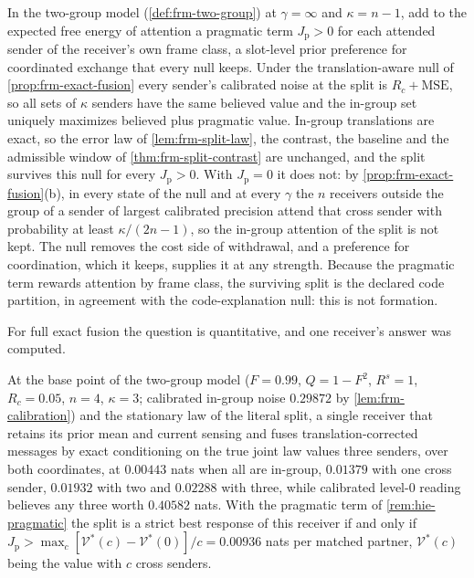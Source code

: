 \begin{remark}\label{rem:hie-pragmatic}
In the two-group model (\cref{def:frm-two-group}) at $\gamma=\infty$ and $\kappa=n-1$, add to the expected free energy of attention a pragmatic term $J_{\mathrm p}>0$ for each attended sender of the receiver's own frame class, a slot-level prior preference for coordinated exchange that every null keeps. Under the translation-aware null of \cref{prop:frm-exact-fusion} every sender's calibrated noise at the split is $R_c+\mathrm{MSE}$, so all sets of $\kappa$ senders have the same believed value and the in-group set uniquely maximizes believed plus pragmatic value. In-group translations are exact, so the error law of \cref{lem:frm-split-law}, the contrast, the baseline and the admissible window of \cref{thm:frm-split-contrast} are unchanged, and the split survives this null for every $J_{\mathrm p}>0$. With $J_{\mathrm p}=0$ it does not: by \cref{prop:frm-exact-fusion}(b), in every state of the null and at every $\gamma$ the $n$ receivers outside the group of a sender of largest calibrated precision attend that cross sender with probability at least $\kappa/(2n-1)$, so the in-group attention of the split is not kept. The null removes the cost side of withdrawal, and a preference for coordination, which it keeps, supplies it at any strength. Because the pragmatic term rewards attention by frame class, the surviving split is the declared code partition, in agreement with the code-explanation null: this is not formation.
\end{remark}

For full exact fusion the question is quantitative, and one receiver's answer was computed.

\begin{observation}\label{obs:hie-exact-receiver}
At the base point of the two-group model ($F=0.99$, $Q=1-F^2$, $R^s=1$, $R_c=0.05$, $n=4$, $\kappa=3$; calibrated in-group noise $0.29872$ by \cref{lem:frm-calibration}) and the stationary law of the literal split, a single receiver that retains its prior mean and current sensing and fuses translation-corrected messages by exact conditioning on the true joint law values three senders, over both coordinates, at $0.00443$ nats when all are in-group, $0.01379$ with one cross sender, $0.01932$ with two and $0.02288$ with three, while calibrated level-0 reading believes any three worth $0.40582$ nats. With the pragmatic term of \cref{rem:hie-pragmatic} the split is a strict best response of this receiver if and only if $J_{\mathrm p}>\max_c[\mathcal V^\ast(c)-\mathcal V^\ast(0)]/c=0.00936$ nats per matched partner, $\mathcal V^\ast(c)$ being the value with $c$ cross senders.
\end{observation}

